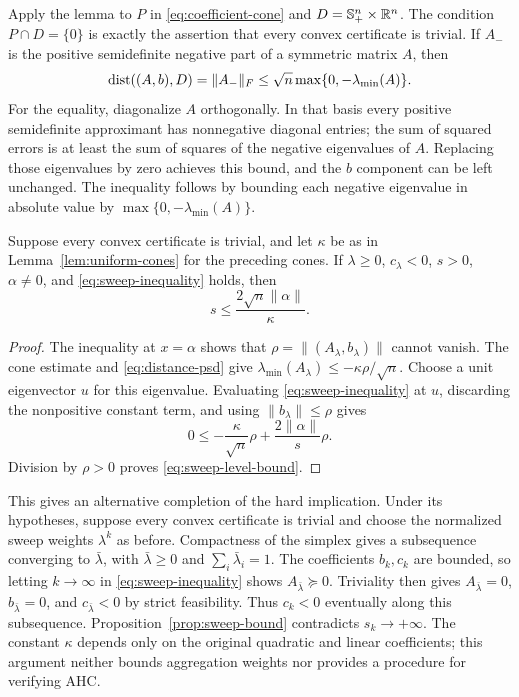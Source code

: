 Apply the lemma to $P$ in \eqref{eq:coefficient-cone} and
$D=\mathbb S^n_+\times\mathbb R^n$. The condition $P\cap D=\{0\}$ is exactly
the assertion that every convex certificate is trivial. If $A_-$ is
the positive semidefinite negative part of a symmetric matrix $A$, then
\begin{equation}\label{eq:distance-psd}
 \operatorname{dist}((A,b),D)=\|A_-\|_F
 \leq\sqrt n\max\{0,-\lambda_{\min}(A)\}.
\end{equation}
For the equality, diagonalize $A$ orthogonally. In that basis every
positive semidefinite approximant has nonnegative diagonal entries;
the sum of squared errors is at least the sum of squares of the
negative eigenvalues of $A$. Replacing those eigenvalues by zero
achieves this bound, and the $b$ component can be left unchanged.
The inequality follows by bounding each negative eigenvalue in
absolute value by $\max\{0,-\lambda_{\min}(A)\}$.

\begin{proposition}\label{prop:sweep-bound}
Suppose every convex certificate is trivial, and let $\kappa$ be as
in Lemma~\ref{lem:uniform-cones} for the preceding cones. If
$\lambda\geq0$, $c_\lambda<0$, $s>0$, $\alpha\ne0$, and
\eqref{eq:sweep-inequality} holds, then
\begin{equation}\label{eq:sweep-level-bound}
 s\leq\frac{2\sqrt n\|\alpha\|}{\kappa}.
\end{equation}
\end{proposition}
\begin{proof}
The inequality at $x=\alpha$ shows that
$\rho=\|(A_\lambda,b_\lambda)\|$ cannot vanish.
The cone estimate and \eqref{eq:distance-psd} give
$\lambda_{\min}(A_\lambda)\leq-\kappa\rho/\sqrt n$.
Choose a unit eigenvector $u$ for this eigenvalue. Evaluating
\eqref{eq:sweep-inequality} at $u$, discarding the nonpositive
constant term, and using $\|b_\lambda\|\leq\rho$ gives
\[
 0\leq-\frac{\kappa}{\sqrt n}\rho
          +\frac{2\|\alpha\|}{s}\rho.
\]
Division by $\rho>0$ proves \eqref{eq:sweep-level-bound}.
\end{proof}

This gives an alternative completion of the hard implication. Under
its hypotheses, suppose every convex certificate is trivial and choose
the normalized sweep weights $\lambda^k$ as before. Compactness of
the simplex gives a subsequence converging to $\bar\lambda$, with
$\bar\lambda\geq0$ and $\sum_i\bar\lambda_i=1$.
The coefficients $b_k,c_k$ are bounded, so letting $k\to\infty$ in
\eqref{eq:sweep-inequality} shows $A_{\bar\lambda}\succeq0$.
Triviality then gives $A_{\bar\lambda}=0$, $b_{\bar\lambda}=0$,
and $c_{\bar\lambda}<0$ by strict feasibility. Thus $c_k<0$
eventually along this subsequence. Proposition~\ref{prop:sweep-bound}
contradicts $s_k\to+\infty$.
The constant $\kappa$ depends only on the original quadratic and linear
coefficients; this argument neither bounds aggregation weights nor
provides a procedure for verifying AHC.
